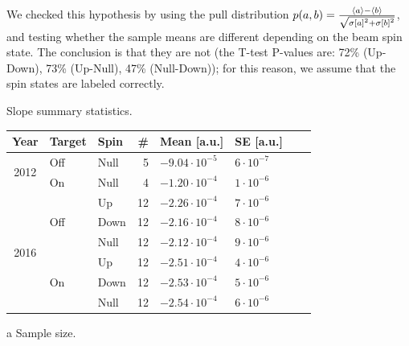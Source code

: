 \documentclass[reprint, superscriptaddress]{revtex4-1}
\newcommand{\vp}[2]{#1\cdot10^{#2}}
\begin{document}
We checked this hypothesis by using the pull distribution $p(a,b) = \frac{\avg{a}-\avg{b}}{\sqrt{\SE{a}^2+\SE{b}^2}}$, and testing whether the sample means are different depending on the beam spin state. The conclusion is that they are not (the T-test P-values are: 72\% (Up-Down), 73\% (Up-Null), 47\% (Null-Down)); for this reason, we assume that the spin states are labeled correctly.

\begin{threeparttable}[h]
	\centering
	\caption{Slope summary statistics. \label{tbl:Slp-big}}
	\begin{tabular}{c|llrllrr}
		\hline\hline
		        Year          & Target               & Spin & \#\tnote{a} & Mean [a.u.]      & SE [a.u.]    &  \\ \hline
		\multirow{2}{*}{2012} & Off                  & Null & 5           & $\vp{-9.04}{-5}$ & $\vp{6}{-7}$ &  \\
		                      & On                   & Null & 4           & $\vp{-1.20}{-4}$ & $\vp{1}{-6}$ &  \\ \hline
		\multirow{6}{*}{2016} & \multirow{3}{*}{Off} & Up   & 12          & $\vp{-2.26}{-4}$ & $\vp{7}{-6}$ &  \\
		                      &                      & Down & 12          & $\vp{-2.16}{-4}$ & $\vp{8}{-6}$ &  \\
		                      &                      & Null & 12          & $\vp{-2.12}{-4}$ & $\vp{9}{-6}$ &  \\
		                      & \multirow{3}{*}{On}  & Up   & 12          & $\vp{-2.51}{-4}$ & $\vp{4}{-6}$ &  \\
		                      &                      & Down & 12          & $\vp{-2.53}{-4}$ & $\vp{5}{-6}$ &  \\
		                      &                      & Null & 12          & $\vp{-2.54}{-4}$ & $\vp{6}{-6}$ &  \\ \hline\hline
	\end{tabular}
	\begin{tablenotes}
		\item[a]{Sample size.}
	\end{tablenotes}
\end{threeparttable}
\end{document}
